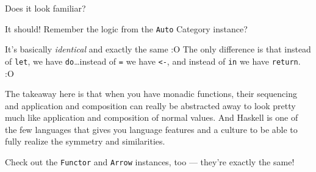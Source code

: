 \documentclass[]{article}
\newenvironment{Shaded}{}{}
\newcommand{\KeywordTok}[1]{\textcolor[rgb]{0.00,0.44,0.13}{\textbf{{#1}}}}
\newcommand{\DataTypeTok}[1]{\textcolor[rgb]{0.56,0.13,0.00}{{#1}}}
\newcommand{\CommentTok}[1]{\textcolor[rgb]{0.38,0.63,0.69}{\textit{{#1}}}}
\newcommand{\OtherTok}[1]{\textcolor[rgb]{0.00,0.44,0.13}{{#1}}}
\newcommand{\FunctionTok}[1]{\textcolor[rgb]{0.02,0.16,0.49}{{#1}}}
\newcommand{\NormalTok}[1]{{#1}}
\begin{document}
Does it look familiar?

It should! Remember the logic from the \texttt{Auto} Category instance?

\begin{Shaded}
\end{Shaded}

It's basically \emph{identical} and exactly the same :O The only
difference is that instead of \texttt{let}, we have
\texttt{do}\ldots{}instead of \texttt{=} we have \texttt{\textless{}-},
and instead of \texttt{in} we have \texttt{return}. :O

The takeaway here is that when you have monadic functions, their
sequencing and application and composition can really be abstracted away
to look pretty much like application and composition of normal values.
And Haskell is one of the few languages that gives you language features
and a culture to be able to fully realize the symmetry and similarities.

Check out the \texttt{Functor} and \texttt{Arrow} instances, too ---
they're exactly the same!
\end{document}
